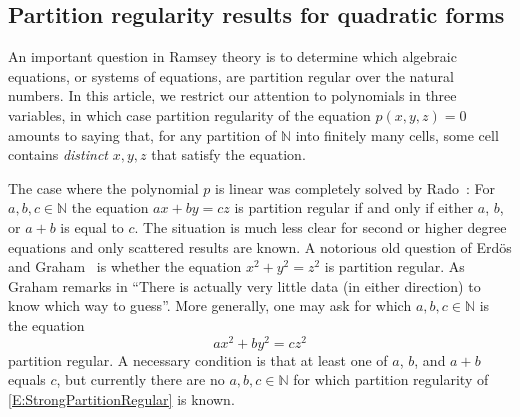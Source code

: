\documentclass[11pt]{amsart}
\theoremstyle{definition}
\begin{document}
\subsection{Partition regularity results for quadratic forms}
An important question in Ramsey theory is to determine which
algebraic equations, or systems of equations, are partition regular
over the natural numbers. In this article,  we restrict our attention to
polynomials in three variables, in which case  partition regularity of
 the equation  $p(x,y,z)=0$  amounts to  saying that,
 for any partition of  ${{\mathbb N}}$ into finitely many
cells, some cell contains \emph{distinct} $x,y,z$ that satisfy the
equation.

 The case where the polynomial $p$ is linear
was completely solved by  Rado~\cite{R33}: For $a,b,c\in
{{\mathbb N}}$  the equation $ax+by=cz$ is partition regular if and only if
either $a$, $b$, or $a+b$ is equal to $c$.
The situation is much less clear   for second or higher degree
equations and only scattered results are known.
A notorious old question of Erd\"{o}s and Graham~\cite{EG80} is
whether the equation $x^2+y^2=z^2$ is partition regular. As Graham
remarks in \cite{G08} ``There is actually very little data (in
either direction) to know which way to guess''. More generally, one
may ask for which $a,b,c\in {{\mathbb N}}$ is the equation
\begin{equation}\label{E:StrongPartitionRegular}
ax^2+by^2=cz^2
\end{equation}
 partition regular. A necessary condition is that at least  one of
$a$, $b$, and $a+b$ equals $c$, but currently there are no $a,b,c\in
{{\mathbb N}}$ for which partition regularity of 
\eqref{E:StrongPartitionRegular} is known.
\end{document}
